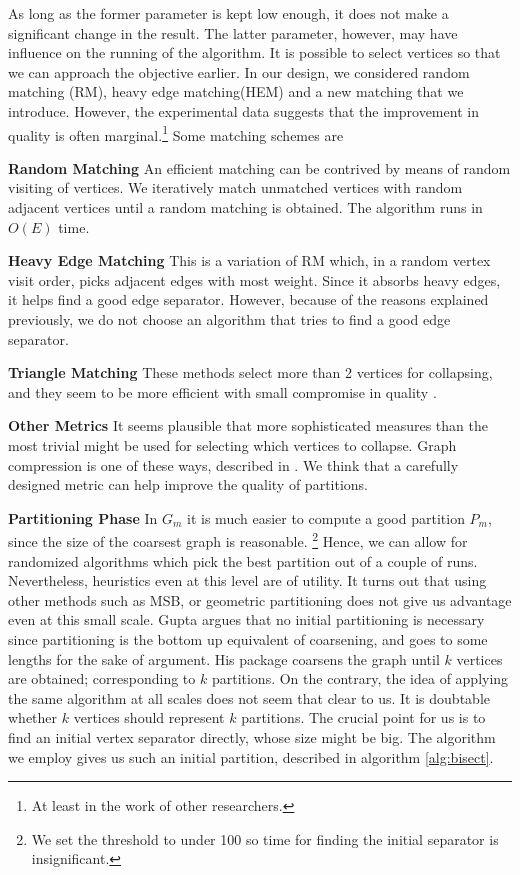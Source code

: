 \documentclass[a4paper,12pt]{article}
\begin{document}
\begin{description}
As long as the former parameter is kept low enough,
it does not make a significant change in the result. The latter
parameter, however, may have influence on the running of the
algorithm. It is possible to select vertices so that we can approach
the objective earlier. In our design, we considered random matching (RM),
heavy edge matching(HEM) and a new matching that we
introduce. However, the experimental data suggests that the
improvement in quality is often marginal.\footnote{At least in the
work of other researchers.} Some matching schemes are
\begin{description}
\item{\textbf{Random Matching}} An efficient matching can be contrived by
means of random visiting of vertices. We iteratively match unmatched
vertices with random adjacent vertices until a random matching is
obtained. The algorithm runs in $O(E)$ time.
\item{\textbf{Heavy Edge Matching}} This is a variation of RM which, in a
random vertex visit order, picks adjacent edges with most
weight. Since it absorbs heavy edges, it helps find a good edge
separator. However, because of the reasons explained previously, we do
not choose an algorithm that tries to find a good edge separator.
\item{\textbf{Triangle Matching}} These methods select more than 2 vertices
for collapsing, and they seem to be more efficient with small
compromise in quality \cite{gupta1}.
\item{\textbf{Other Metrics}} It seems plausible that more
sophisticated measures than the most trivial might be used for
selecting which vertices to collapse. Graph compression is one of
these ways, described in \cite{bend}. We think that a carefully
designed metric can help improve the quality of partitions.
\end{description}

\item \textbf{Partitioning Phase} In $G_m$ it is much easier to
compute a good partition $P_m$, since the size of the coarsest graph is
reasonable. \footnote{We set the threshold to under 100 so time for finding the
initial separator is insignificant.} Hence, we can allow for randomized
algorithms which pick the best partition out of a couple of
runs. Nevertheless, heuristics even at this level are of
utility. It turns out that using other methods such as MSB, or
geometric partitioning does not give us advantage even at this small
scale\cite{kumar}. Gupta \cite{gupta1} argues that no initial
partitioning is necessary since partitioning is the bottom up
equivalent of coarsening, and goes to some lengths for the sake of
argument. His package coarsens the graph until $k$ vertices are
obtained; corresponding to $k$ partitions. On the contrary,  the idea
of applying the same algorithm at all scales does not seem that clear
to us. It is doubtable whether $k$ vertices should represent $k$
partitions. The crucial point for us is to find an initial vertex
separator directly, whose size might be big. The algorithm we employ
gives us such an initial partition, described in algorithm \ref{alg:bisect}.


\end{description}
\end{document}
